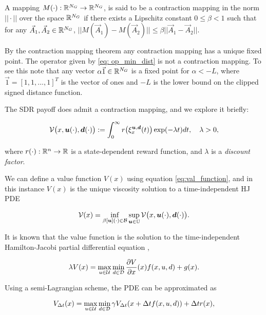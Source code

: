 \begin{definition} A mapping $M(\cdot): \mathbb{R}^{N_G} \rightarrow \mathbb{R}^{N_G}$, is said to be a contraction mapping in the norm $|| \cdot ||$ over the space $\mathbb{R}^{N_G}$ if there exists a Lipschitz constant $0\leq \beta < 1$ such that for any $\vec{A}_1, \vec{A}_2 \in \mathbb{R}^{N_G}$, $||M(\vec{A}_1) - M(\vec{A}_2)|| \leq \beta ||\vec{A}_1 - \vec{A}_2||$. 
\end{definition}

By the contraction mapping theorem any contraction mapping has a unique fixed point. The operator given by \eqref{eq: op_min_dist} is not a contraction mapping. To see this note that any vector $\alpha \vec{1} \in \mathbb{R}^{N_G}$ is a fixed point for $\alpha < -L$, where $\vec{1}= [1, 1, ..., 1]^T$ is the vector of ones and $-L$ is the lower bound on the clipped signed distance function.

The SDR payoff does admit a contraction mapping, and we explore it briefly:

\begin{equation}\label{eq:V_sum_rewards}
\mathcal{V}\big(x,\bm{u}(\cdot),\bm{d}(\cdot)\big) := \int_{0}^{\infty}r\big(\xi_{x}^{\bm{u},\bm{d}}(t)\big)\exp(-\lambda t) dt,  \quad \lambda >0,
\end{equation}

\noindent where $r(\cdot):\mathbb{R}^n \rightarrow \mathbb{R}$ is a state-dependent reward function, and $\lambda$ is a \emph{discount factor}. 

We can define a value function $V(x)$ using equation \eqref{eq:val_function}, and in this instance $V(x)$ is the unique viscosity solution to a time-independent HJ PDE 

\begin{equation}
\mathcal{V}(x)=\inf_{\beta[\bm{u}](\cdot) \in \mathcal{B}} \sup_{\bm{u} \in \mathbb{U}}\mathcal{V}\big(x,\bm{u}(\cdot),\bm{d}(\cdot)\big).
\end{equation}

It is known that the value function is the solution to the time-independent Hamilton-Jacobi partial differential equation \cite{Bardi2008},

\begin{equation}
\lambda V(x) = \max_{u\in\mathcal{U}} \min_{ d\in\mathcal{D}} \frac{\partial V}{\partial x}(x) f(x, u, d)+ g(x).
\end{equation}

Using a semi-Lagrangian scheme, the PDE can be approximated as

\begin{equation}
V_{\Delta t}(x) = \max_{u\in\mathcal{U}} \min_{ d\in\mathcal{D}} \gamma V_{\Delta t}(x + \Delta t f(x, u, d))  + \Delta t r(x),
\end{equation}
 
